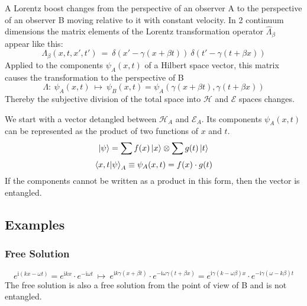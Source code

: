 \documentclass[12pt]{article}
\begin{document}
A Lorentz boost changes from the perspective of an observer A to the perspective of an observer B moving relative to it with constant velocity. In 2 continuum dimensions the matrix elements of the Lorentz transformation operator $\hat{\Lambda}_\beta$ appear like this:
\begin{equation}
\label{eq:matrix_lorentz}
\Lambda_\beta(x,t,x',t')\ =\ \delta(x'-\gamma(x+\beta t))\ \delta(t'-\gamma(t+\beta x))
\end{equation}
Applied to the components $\psi_A(x,t)$ of a Hilbert space vector, this matrix causes the transformation to the perspective of B
\begin{equation}
\label{eq:lorentz_scalar}
\Lambda:\ \psi_A(x,t)\ \mapsto\ \psi_B(x,t) = \psi_A(\gamma(x+\beta t),\gamma(t+\beta x))
\end{equation}
Thereby the subjective division of the total space into $\mathscr{H}$ and $\mathscr{E}$ spaces changes.

We start with a vector detangled between $\mathscr{H}_A$ and $\mathscr{E}_A$. Its components $\psi_A(x,t)$ can be represented as the product of two functions of $x$ and $t$. 
\begin{equation*}
\ket{\psi} = \sum f(x) \ket{x} \otimes  \sum g(t) \ket{t}
\end{equation*}
\begin{equation*}
\bra{x,t}\ket{\psi}_A \equiv \psi_A(x,t) = f(x) \cdot g(t)
\end{equation*}
If the components cannot be written as a product in this form, then the vector is entangled. 

\subsection{Examples}

\subsubsection{Free Solution}

\begin{equation*}
e^{\mathrm{i}(kx-\omega t)}
= 
e^{\mathrm{i}kx}\cdot e^{-\mathrm{i}\omega t}
\ \mapsto \ 
e^{\mathrm{i}k\gamma(x+\beta t)} \cdot e^{-\mathrm{i}\omega \gamma(t+\beta x)}
= 
e^{\mathrm{i}\gamma(k-\omega \beta)x} \cdot e^{-\mathrm{i}\gamma(\omega- k \beta)t}
\end{equation*}
The free solution is also a free solution from the point of view of B and is not entangled. 
\end{document}
